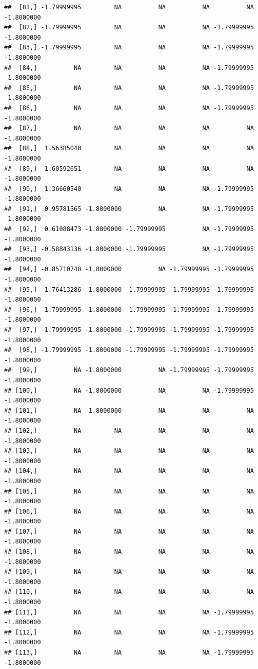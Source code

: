 \documentclass{article}\usepackage[]{graphicx}\usepackage[]{color}
\makeatletter
\newenvironment{kframe}{%
 \def\at@end@of@kframe{}%
 \ifinner\ifhmode%
  \def\at@end@of@kframe{\end{minipage}}%
  \begin{minipage}{\columnwidth}%
 \fi\fi%
 \def\FrameCommand##1{\hskip\@totalleftmargin \hskip-\fboxsep
 \colorbox{shadecolor}{##1}\hskip-\fboxsep
     \hskip-\linewidth \hskip-\@totalleftmargin \hskip\columnwidth}%
 \MakeFramed {\advance\hsize-\width
   \@totalleftmargin\z@ \linewidth\hsize
   \@setminipage}}%
 {\par\unskip\endMakeFramed%
 \at@end@of@kframe}
\newenvironment{knitrout}{}{} %
\makeatother
\begin{document}
\begin{knitrout}
\begin{kframe}
\begin{verbatim}
##  [81,] -1.79999995         NA          NA          NA          NA -1.8000000
##  [82,] -1.79999995         NA          NA          NA -1.79999995 -1.8000000
##  [83,] -1.79999995         NA          NA          NA -1.79999995 -1.8000000
##  [84,]          NA         NA          NA          NA -1.79999995 -1.8000000
##  [85,]          NA         NA          NA          NA -1.79999995 -1.8000000
##  [86,]          NA         NA          NA          NA -1.79999995 -1.8000000
##  [87,]          NA         NA          NA          NA          NA -1.8000000
##  [88,]  1.56385040         NA          NA          NA          NA -1.8000000
##  [89,]  1.60592651         NA          NA          NA          NA -1.8000000
##  [90,]  1.36660540         NA          NA          NA -1.79999995 -1.8000000
##  [91,]  0.95781565 -1.8000000          NA          NA -1.79999995 -1.8000000
##  [92,]  0.61088473 -1.8000000 -1.79999995          NA -1.79999995 -1.8000000
##  [93,] -0.58843136 -1.8000000 -1.79999995          NA -1.79999995 -1.8000000
##  [94,] -0.85710740 -1.8000000          NA -1.79999995 -1.79999995 -1.8000000
##  [95,] -1.76413286 -1.8000000 -1.79999995 -1.79999995 -1.79999995 -1.8000000
##  [96,] -1.79999995 -1.8000000 -1.79999995 -1.79999995 -1.79999995 -1.8000000
##  [97,] -1.79999995 -1.8000000 -1.79999995 -1.79999995 -1.79999995 -1.8000000
##  [98,] -1.79999995 -1.8000000 -1.79999995 -1.79999995 -1.79999995 -1.8000000
##  [99,]          NA -1.8000000          NA -1.79999995 -1.79999995 -1.8000000
## [100,]          NA -1.8000000          NA          NA -1.79999995 -1.8000000
## [101,]          NA -1.8000000          NA          NA          NA -1.8000000
## [102,]          NA         NA          NA          NA          NA -1.8000000
## [103,]          NA         NA          NA          NA          NA -1.8000000
## [104,]          NA         NA          NA          NA          NA -1.8000000
## [105,]          NA         NA          NA          NA          NA -1.8000000
## [106,]          NA         NA          NA          NA          NA -1.8000000
## [107,]          NA         NA          NA          NA          NA -1.8000000
## [108,]          NA         NA          NA          NA          NA -1.8000000
## [109,]          NA         NA          NA          NA          NA -1.8000000
## [110,]          NA         NA          NA          NA          NA -1.8000000
## [111,]          NA         NA          NA          NA -1.79999995 -1.8000000
## [112,]          NA         NA          NA          NA -1.79999995 -1.8000000
## [113,]          NA         NA          NA          NA -1.79999995 -1.8000000

\end{verbatim}
\end{kframe}
\end{knitrout}
\end{document}
